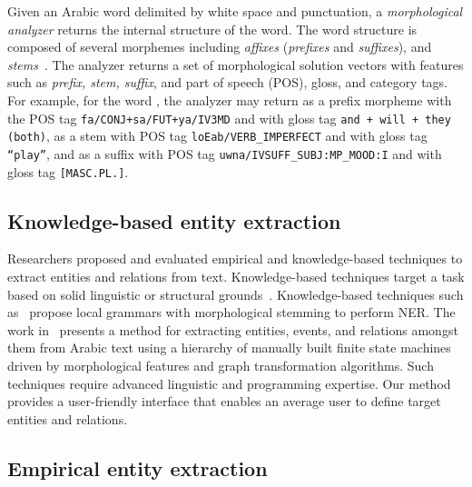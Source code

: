 Given an Arabic word delimited by white space and punctuation, 
a {\em morphological analyzer} returns the internal structure of the word. 
The word structure is composed of several morphemes including 
{\em affixes} ({\em prefixes} and {\em suffixes}), and 
{\em stems}~\cite{arabicmorph}. 
The analyzer returns a set of morphological solution vectors with features
such as {\em prefix, stem, suffix}, and part of speech (POS), gloss, and category tags. 
\vocalize
For example, for the word ,
the analyzer may return 
as a prefix morpheme with the POS tag {\tt fa/CONJ+sa/FUT+ya/IV3MD}
and with gloss tag {\tt and + will + they (both)},
 as a stem with POS tag {\tt loEab/VERB\_IMPERFECT}
and with gloss tag {\tt ``play''},
and 
as a suffix with POS tag {\tt uwna/IVSUFF\_SUBJ:MP\_MOOD:I}
and with gloss tag {\tt [MASC.PL.]}.
\novocalize

\subsection*{Knowledge-based entity extraction}

Researchers proposed and evaluated empirical and knowledge-based techniques to extract entities and relations from text. 
Knowledge-based techniques target a task based on solid linguistic or structural grounds~\cite{soudi2007arabic}.
Knowledge-based techniques such as~\cite{zaghouani2010adapting,traboulsi2009arabic} propose local grammars 
with morphological stemming to perform NER. 
The work in~\cite{ZaMaHaCicling2012Entity} presents a method for extracting entities, 
events, and relations amongst them from Arabic text using a hierarchy of manually built 
finite state machines driven by morphological features and graph transformation algorithms. 
Such techniques require advanced linguistic and programming expertise. 
Our method provides a user-friendly interface that enables an average user to define 
target entities and relations.

\subsection*{Empirical entity extraction}


